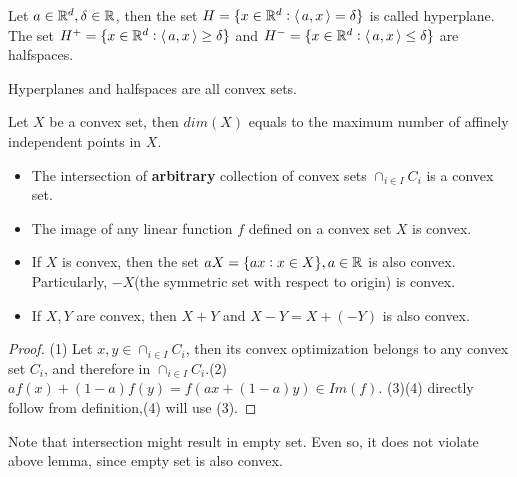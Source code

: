 \begin{refsection}
\begin{remark}
\end{remark}

\begin{definition}
Let $a\in \mathbb{R}^d,\delta\in \mathbb{R}$, then the set $H=\{x\in \mathbb{R}^d:{\left< \, a,x \, \right>} = \delta\}$ is called hyperplane. The set $H^+=\{x\in \mathbb{R}^d:{\left< \, a,x \, \right>} \geq \delta\}$ and $H^-=\{x\in \mathbb{R}^d:{\left< \, a,x \, \right>} \leq \delta\}$ are halfspaces. 
\end{definition}

\begin{remark}
Hyperplanes and halfspaces are all convex sets. 
\end{remark}

\begin{definition}
	Let $X$ be a convex set, then $dim(X)$ equals to the maximum number of affinely independent points in $X$.
\end{definition}


\begin{lemma}\label{ch:convex-analysis:th:preservationconvexity}\hfill
	\begin{itemize}
		\item The intersection of \textbf{arbitrary} collection of convex sets $\cap_{i\in I}C_i$ is a convex set.
		\item The image of any linear function $f$ defined on a convex set $X$ is convex.
		\item If $X$ is convex, then the set $aX=\{ax:x\in X\},a\in \mathbb{R}$ is also convex. Particularly, $-X$(the symmetric set with respect to origin) is convex.
		\item If $X,Y$ are convex, then $X+Y$ and $X-Y = X+(-Y)$ is also convex.
	\end{itemize}
\end{lemma}
\begin{proof}
(1)	Let $x,y \in \cap_{i\in I}C_i$, then its convex optimization belongs to any convex set $C_i$, and therefore in $\cap_{i\in I}C_i$.(2)$a f(x) + (1-a) f(y) = f(ax+(1-a)y) \in Im(f)$. (3)(4) directly follow from definition,(4) will use (3).
\end{proof}

\begin{remark}
Note that intersection might result in empty set. Even so, it does not violate above lemma, since empty set is also convex.
\end{remark}



\end{refsection}
